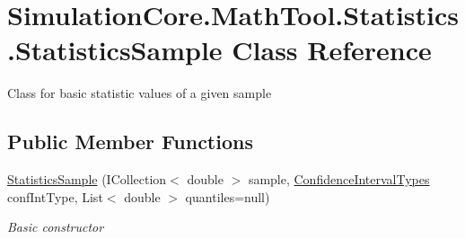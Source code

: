 \hypertarget{class_simulation_core_1_1_math_tool_1_1_statistics_1_1_statistics_sample}{}\section{Simulation\+Core.\+Math\+Tool.\+Statistics.\+Statistics\+Sample Class Reference}
\label{class_simulation_core_1_1_math_tool_1_1_statistics_1_1_statistics_sample}


Class for basic statistic values of a given sample  


\subsection*{Public Member Functions}
\begin{DoxyCompactItemize}
\item 
\hyperlink{class_simulation_core_1_1_math_tool_1_1_statistics_1_1_statistics_sample_a179a19b162bb7b7ea2b42253ce80b6b7}{Statistics\+Sample} (I\+Collection$<$ double $>$ sample, \hyperlink{namespace_simulation_core_1_1_math_tool_1_1_distributions_a4c9ae1b703094a62fce6e2b2415e1122}{Confidence\+Interval\+Types} conf\+Int\+Type, List$<$ double $>$ quantiles=null)
\begin{DoxyCompactList}\small\item\em Basic constructor \end{DoxyCompactList}\end{DoxyCompactItemize}
